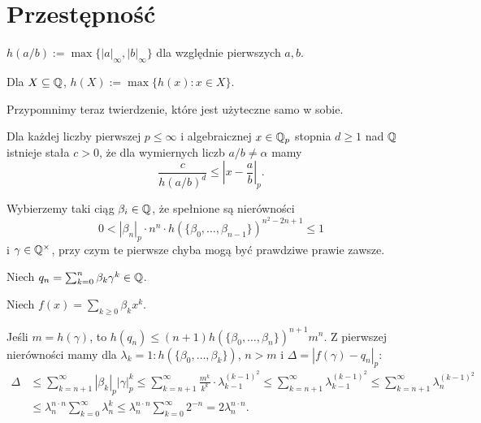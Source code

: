 \section{Przestępność}
\begin{definicja}[lokalna]
	$h(a/b) := \max \{|a|_\infty, |b|_\infty\}$ dla względnie pierwszych $a, b$.
\end{definicja}

\begin{definicja}
	Dla $X \subseteq \mathbb Q$, $h(X) := \max\{h(x) : x \in X\}$.
\end{definicja}

Przypomnimy teraz twierdzenie, które jest użyteczne samo w sobie.

\begin{twierdzenie}[Liouville'a]
	Dla każdej liczby pierwszej $p \le \infty$ i algebraicznej $x \in \mathbb Q_p$ stopnia $d \ge 1$ nad $\mathbb Q$ istnieje stała $c > 0$, że dla wymiernych liczb $a / b \neq \alpha$ mamy
	\[
		\frac{c}{h(a/b)^d} \le \left|x - \frac ab \right|_p.
	\]
\end{twierdzenie}

Wybierzemy taki ciąg $\beta_i \in \mathbb Q$, że spełnione są nierówności
\[
	0 < |\beta_n|_p \cdot n^n \cdot h(\{\beta_0, \ldots, \beta_{n-1}\})^{n^2-2n+1} \le 1
\] i $\gamma \in \mathbb Q^\times$, przy czym te pierwsze chyba mogą być prawdziwe prawie zawsze.

\begin{definicja}
	Niech $q_n = \sum_{k = 0}^n \beta_k \gamma^k \in \mathbb Q$.
\end{definicja}

\begin{definicja}
	Niech $f(x) = \sum_{k \ge 0} \beta_k x^k$.
\end{definicja}

Jeśli $m = h(\gamma)$, to $h(q_n) \le (n+1) h(\{\beta_0, \ldots, \beta_n\})^{n+1} m^n$.
Z pierwszej nierówności mamy dla $\lambda_k = 1 : h(\{\beta_0, \ldots, \beta_{k}\})$, $n > m$ i $\Delta = |f(\gamma) - q_n|_p$:
\begin{align*}
	\Delta & \le \sum_{k = n+1}^\infty |\beta_k|_p |\gamma|_p^k \le \sum_{k = n+1}^\infty \frac{m^k}{k^k} \cdot \lambda_{k-1}^{(k-1)^2}  \le \sum_{k = n+1}^\infty \lambda_{k-1}^{(k-1)^2} \le \sum_{k=n+1}^\infty \lambda_n^{(k-1)^2} \\ %
	& \le \lambda_n^{n \cdot n} \sum_{k = 0}^\infty \lambda_n^k \le \lambda_n^{n \cdot n} \sum_{k = 0}^\infty 2^{-n} = 2 \lambda_n^{n \cdot n}.
\end{align*}

